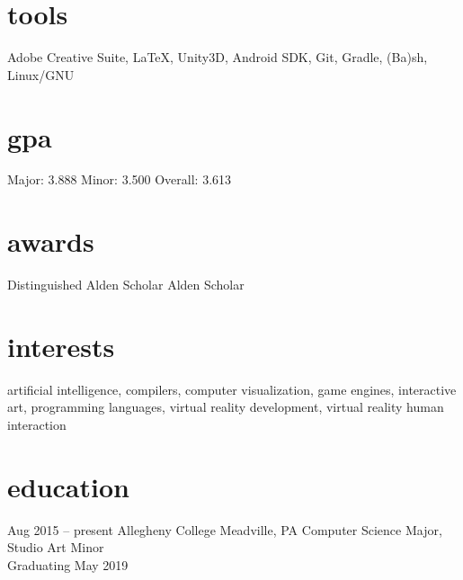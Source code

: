 \documentclass[]{friggeri-cv}
\begin{document}
\begin{aside}
  \section{tools}\vspace{0.05cm}
    Adobe Creative Suite, \LaTeX , Unity3D, Android SDK, Git, Gradle, (Ba)sh, Linux/GNU
  \section{gpa}\vspace{0.1cm}
  	Major: 3.888
  	Minor: 3.500
    Overall: 3.613\vspace{0.1cm}
  \section{awards}\vspace{0.05cm}
  Distinguished Alden Scholar\vspace{0.1cm}
  Alden Scholar\vspace{0.1cm}
\end{aside}

\section{interests}

artificial intelligence, compilers, computer visualization, game engines, interactive art, programming languages, virtual reality development, virtual reality human interaction

\section{education}
\begin{entrylist}
  \entry
    {Aug 2015 -- present}
    {Allegheny College}
    {Meadville, PA}
    {Computer Science Major, Studio Art Minor\\Graduating May 2019}
\end{entrylist}
\end{document}
